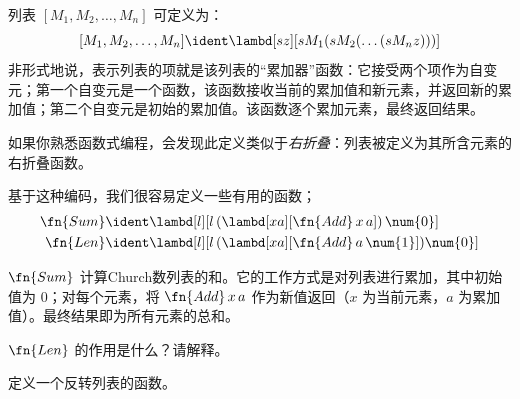 \documentclass[../../../include/open-logic-section]{subfiles}
\begin{document}

列表 $[M_1, M_2, \ldots, M_n]$ 可定义为：
\[
  [M_1, M_2, \ldots, M_n] \ident \lambd[sz][s M_1 (s M_2 (\ldots (s M_n z)))]
\]
非形式地说，表示列表的项就是该列表的“累加器”函数：它接受两个项作为自变元；第一个自变元是一个函数，该函数接收当前的累加值和新元素，并返回新的累加值；第二个自变元是初始的累加值。该函数逐个累加元素，最终返回结果。

\begin{digress}
  如果你熟悉函数式编程，会发现此定义类似于\emph{右折叠}：列表被定义为其所含元素的右折叠函数。
\end{digress}

基于这种编码，我们很容易定义一些有用的函数；
\begin{align*}
  \fn{Sum} & \ident
  \lambd[l][l \, (\lambd[xa][\fn{Add} \, x \, a])\,  \num{0}]\\
  \fn{Len} & \ident
  \lambd[l][l \, (\lambd[xa][\fn{Add} \, a \, \num{1}]) \num{0}]
\end{align*}

$\fn{Sum}$ 计算Church数列表的和。它的工作方式是对列表进行累加，其中初始值为 $\num{0}$；对每个元素，将 $\fn{Add} \, x\, a$ 作为新值返回（$x$ 为当前元素，$a$ 为累加值）。最终结果即为所有元素的总和。

\begin{prob}
  $\fn{Len}$ 的作用是什么？请解释。
\end{prob}

\begin{prob}
  定义一个反转列表的函数。
\end{prob}
\end{document}
